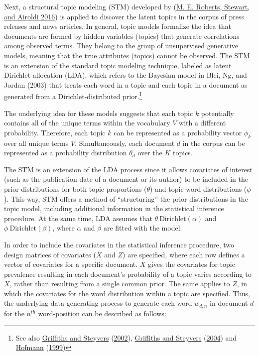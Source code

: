 \documentclass[
]{article}
\begin{document}
Next, a structural topic modeling (STM) developed by
(\protect\hyperlink{ref-roberts_model_2016}{M. E. Roberts, Stewart, and
Airoldi 2016}) is applied to discover the latent topics in the corpus of
press releases and news articles. In general, topic models formalize the
idea that documents are formed by hidden variables (topics) that
generate correlations among observed terms. They belong to the group of
unsupervised generative models, meaning that the true attributes
(topics) cannot be observed. The STM is an extension of the standard
topic modeling technique, labeled as latent Dirichlet allocation (LDA),
which refers to the Bayesian model in Blei, Ng, and Jordan (2003) that
treats each word in a topic and each topic in a document as generated
from a Dirichlet-distributed prior.\footnote{See also
  \protect\hyperlink{ref-griffiths_probabilistic_2002}{Griffiths and
  Steyvers}
  (\protect\hyperlink{ref-griffiths_probabilistic_2002}{2002}),
  \protect\hyperlink{ref-griffiths_finding_2004}{Griffiths and Steyvers}
  (\protect\hyperlink{ref-griffiths_finding_2004}{2004}) and
  \protect\hyperlink{ref-hofmann_probabilistic_1999}{Hofmann}
  (\protect\hyperlink{ref-hofmann_probabilistic_1999}{1999})}

The underlying idea for these models suggests that each topic \(k\)
potentially contains all of the unique terms within the vocabulary \(V\)
with a different probability. Therefore, each topic \(k\) can be
represented as a probability vector \(\phi_k\) over all unique terms
\(V\). Simultaneously, each document \(d\) in the corpus can be
represented as a probability distribution \(\theta_d\) over the \(K\)
topics.

The STM is an extension of the LDA process since it allows covariates of
interest (such as the publication date of a document or its author) to
be included in the prior distributions for both topic proportions
(\(\theta\)) and topic-word distributions (\(\phi\)). This way, STM
offers a method of ``structuring'' the prior distributions in the topic
model, including additional information in the statistical inference
procedure. At the same time, LDA assumes that
\(\theta ~ \text{Dirichlet}(\alpha)\) and
\(\phi ~ \text{Dirichlet}(\beta)\), where \(\alpha\) and \(\beta\) are
fitted with the model.

In order to include the covariates in the statistical inference
procedure, two design matrices of covariates (\(X\) and \(Z\)) are
specified, where each row defines a vector of covariates for a specific
document. \(X\) gives the covariates for topic prevalence resulting in
each document's probability of a topic varies according to \(X\), rather
than resulting from a single common prior. The same applies to \(Z\), in
which the covariates for the word distribution within a topic are
specified. Thus, the underlying data generating process to generate each
word \(w_{d,n}\) in document \(d\) for the \(n^{th}\) word-position can
be described as follows:
\end{document}

